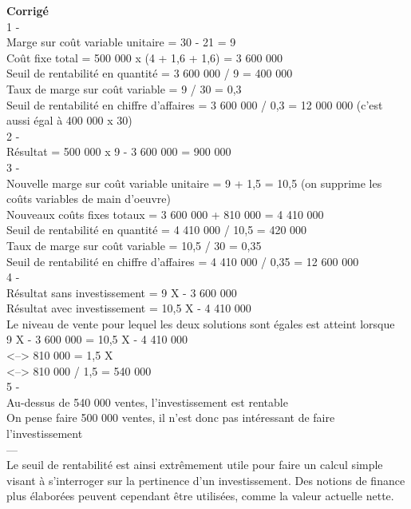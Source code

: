 \documentclass{kaobook}
\begin{document}
\textbf{Corrigé}\\
1 -\\
Marge sur coût variable unitaire = 30 - 21 = 9\\
Coût fixe total = 500 000 x (4 + 1,6 + 1,6) = 3 600 000\\
Seuil de rentabilité en quantité = 3 600 000 / 9 = 400 000\\
Taux de marge sur coût variable = 9 / 30 = 0,3\\
Seuil de rentabilité en chiffre d'affaires = 3 600 000 / 0,3 = 12 000 000 (c'est aussi égal à 400 000 x 30)\\
2 -\\
Résultat = 500 000 x 9 - 3 600 000 = 900 000\\
3 -\\
Nouvelle marge sur coût variable unitaire = 9 + 1,5 = 10,5 (on supprime les coûts variables de main d'oeuvre)\\
Nouveaux coûts fixes totaux = 3 600 000 + 810 000 = 4 410 000\\
Seuil de rentabilité en quantité = 4 410 000 / 10,5 = 420 000\\
Taux de marge sur coût variable = 10,5 / 30 = 0,35\\
Seuil de rentabilité en chiffre d'affaires = 4 410 000 / 0,35 = 12 600 000\\
4 -\\
Résultat sans investissement  = 9 X - 3 600 000\\
Résultat avec investissement = 10,5 X - 4 410 000\\
Le niveau de vente pour lequel les deux solutions sont égales est atteint lorsque\\
9 X - 3 600 000 = 10,5 X - 4 410 000\\
<--> 810 000 = 1,5 X\\
<--> 810 000 / 1,5 = 540 000\\
5 -\\
Au-dessus de 540 000 ventes, l'investissement est rentable\\
On pense faire 500 000 ventes, il n'est donc pas intéressant de faire l'investissement\\
---\\

Le seuil de rentabilité est ainsi extrêmement utile pour faire un calcul simple visant à s'interroger sur la pertinence d'un investissement. Des notions de finance plus élaborées peuvent cependant être utilisées, comme la valeur actuelle nette.\\
\end{document}

